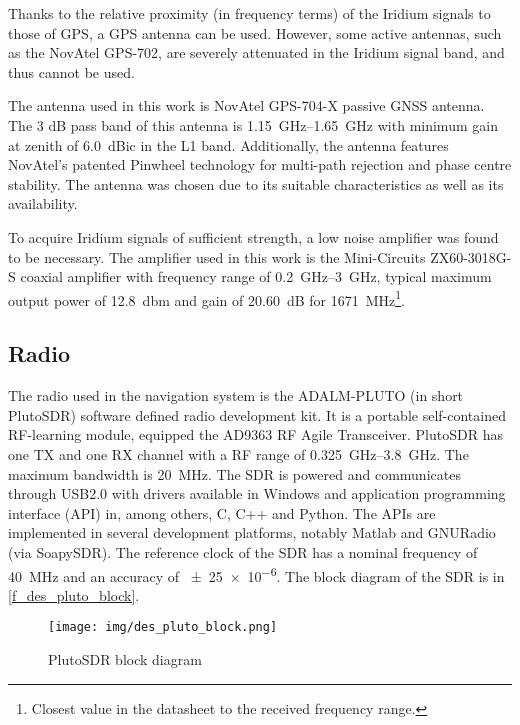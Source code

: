 Thanks to the relative proximity (in frequency terms) of the Iridium signals to those of GPS, a GPS antenna can be used. However, some active antennas, such as the NovAtel GPS-702\cite{des03}, are severely attenuated in the Iridium signal band, and thus cannot be used.

The antenna used in this work is NovAtel GPS-704-X passive GNSS antenna. 
The 3 dB pass band of this antenna is \qtyrange{1.15}{1.65}{GHz} with minimum gain at zenith of \qty{+6.0}{dBic} in the L1 band. Additionally, the antenna features NovAtel’s patented Pinwheel technology for multi-path rejection and phase centre stability\cite{des04}. The antenna was chosen due to its suitable characteristics as well as its availability.

To acquire Iridium signals of sufficient strength, a low noise amplifier was found to be necessary. The amplifier used in this work is the Mini-Circuits ZX60-3018G-S coaxial amplifier with frequency range of \qtyrange{0.2}{3}{GHz}, typical maximum output power of \qty{+12.8}{dbm} and gain of \qty{20.60}{dB} for \qty{1671}{MHz}\footnote{Closest value in the datasheet to the received frequency range.}\cite{des06}.

\subsection{Radio}
The radio used in the navigation system is the ADALM-PLUTO (in short PlutoSDR) software defined radio development kit. It is a portable self-contained RF-learning module, equipped the AD9363 RF Agile Transceiver. PlutoSDR has one TX and one RX channel with a RF range of \qtyrange{0.325}{3.8}{GHz}. The maximum bandwidth is \qty{20}{MHz}. The SDR is powered and communicates through USB2.0 with drivers available in Windows and application programming interface (API) in, among others, C, C++ and Python. The APIs are implemented in several development platforms, notably Matlab and GNURadio (via SoapySDR). The reference clock of the SDR has a nominal frequency of \qty{40}{MHz} and an accuracy of \num{\pm25e-6}\cite{des05}. The block diagram of the SDR is in \autoref{f_des_pluto_block}.

\begin{figure}
    \centering
    \texttt{[image: img/des\_pluto\_block.png]}
    \caption{PlutoSDR block diagram\cite{des05}}
    \label{f_des_pluto_block}
\end{figure}

